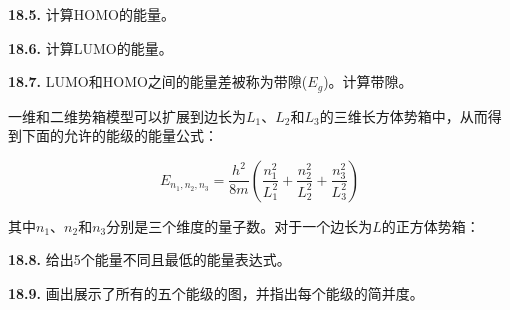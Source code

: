 \noindent\textbf{18.5.} 计算HOMO的能量。

\noindent\textbf{18.6.} 计算LUMO的能量。

\noindent\textbf{18.7.}
LUMO和HOMO之间的能量差被称为带隙($E_g$)。计算带隙。

一维和二维势箱模型可以扩展到边长为$L_1$、$L_2$和$L_3$的三维长方体势箱中，从而得到下面的允许的能级的能量公式：

$$
E_{n_1,n_2,n_3}=\frac{h^2}{8m}\left(\frac{n^2_1}{L_1^2}+\frac{n^2_2}{L_2^2}+\frac{n^2_3}{L_3^2}\right)
$$

其中$n_1$、$n_2$和$n_3$分别是三个维度的量子数。对于一个边长为$L$的正方体势箱：

\noindent\textbf{18.8.} 给出5个能量不同且最低的能量表达式。

\noindent\textbf{18.9.} 画出展示了所有的五个能级的图，并指出每个能级的简并度。
